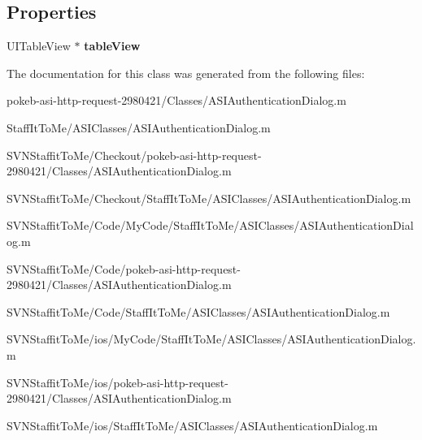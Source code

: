 \subsection*{\-Properties}
\begin{DoxyCompactItemize}
\item 
\hypertarget{interface_a_s_i_authentication_dialog_07_08_a2584d42e49a20173ea672edc70923300}{
\-U\-I\-Table\-View $\ast$ {\bfseries table\-View}}
\label{interface_a_s_i_authentication_dialog_07_08_a2584d42e49a20173ea672edc70923300}

\end{DoxyCompactItemize}


\-The documentation for this class was generated from the following files\-:\begin{DoxyCompactItemize}
\item 
pokeb-\/asi-\/http-\/request-\/2980421/\-Classes/\-A\-S\-I\-Authentication\-Dialog.\-m\item 
\-Staff\-It\-To\-Me/\-A\-S\-I\-Classes/\-A\-S\-I\-Authentication\-Dialog.\-m\item 
\-S\-V\-N\-Staffit\-To\-Me/\-Checkout/pokeb-\/asi-\/http-\/request-\/2980421/\-Classes/\-A\-S\-I\-Authentication\-Dialog.\-m\item 
\-S\-V\-N\-Staffit\-To\-Me/\-Checkout/\-Staff\-It\-To\-Me/\-A\-S\-I\-Classes/\-A\-S\-I\-Authentication\-Dialog.\-m\item 
\-S\-V\-N\-Staffit\-To\-Me/\-Code/\-My\-Code/\-Staff\-It\-To\-Me/\-A\-S\-I\-Classes/\-A\-S\-I\-Authentication\-Dialog.\-m\item 
\-S\-V\-N\-Staffit\-To\-Me/\-Code/pokeb-\/asi-\/http-\/request-\/2980421/\-Classes/\-A\-S\-I\-Authentication\-Dialog.\-m\item 
\-S\-V\-N\-Staffit\-To\-Me/\-Code/\-Staff\-It\-To\-Me/\-A\-S\-I\-Classes/\-A\-S\-I\-Authentication\-Dialog.\-m\item 
\-S\-V\-N\-Staffit\-To\-Me/ios/\-My\-Code/\-Staff\-It\-To\-Me/\-A\-S\-I\-Classes/\-A\-S\-I\-Authentication\-Dialog.\-m\item 
\-S\-V\-N\-Staffit\-To\-Me/ios/pokeb-\/asi-\/http-\/request-\/2980421/\-Classes/\-A\-S\-I\-Authentication\-Dialog.\-m\item 
\-S\-V\-N\-Staffit\-To\-Me/ios/\-Staff\-It\-To\-Me/\-A\-S\-I\-Classes/\-A\-S\-I\-Authentication\-Dialog.\-m\end{DoxyCompactItemize}
